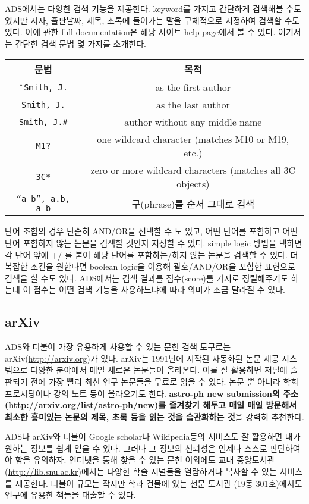 ADS에서는 다양한 검색 기능을 제공한다. keyword를 가지고 간단하게 검색해볼 수도
있지만 저자, 출판날짜, 제목, 초록에 들어가는 말을 구체적으로 지정하여 검색할 수도
있다. 이에 관한 full documentation은 해당 사이트 help page에서 볼 수
있다. 여기서는 간단한 검색 문법 몇 가지를 소개한다.

\begin{tabular}{c|c} \toprule
문법 & 목적 \\ \midrule
\texttt{$\char`\^$Smith, J.} & as the first author \\
\texttt{Smith, J.} & as the last author \\
\texttt{Smith, J.\#} & author without any middle name \\
\texttt{M1?} & one wildcard character (matches M10 or M19, etc.) \\
\texttt{3C*} & zero or more wildcard characters (matches all 3C objects) \\
\texttt{``a b'', a.b, a--b} & 구(phrase)를 순서 그대로 검색 \\ \bottomrule
\end{tabular}

\vspace{\baselineskip} 단어 조합의 경우 단순히 AND/OR을 선택할 수 도 있고, 어떤
단어를 포함하고 어떤 단어 포함하지 않는 논문을 검색할 것인지 지정할 수
있다. simple logic 방법을 택하면 각 단어 앞에 +/-를 붙여 해당 단어를
포함하는/하지 않는 논문을 검색할 수 있다. 더 복잡한 조건을 원한다면 boolean
logic을 이용해 괄호/AND/OR을 포함한 표현으로 검색을 할 수도 있다. ADS에서는 검색
결과를 점수(score)를 가지로 정렬해주기도 하는데 이 점수는 어떤 검색 기능을
사용하느냐에 따라 의미가 조금 달라질 수 있다.
 
\subsection{arXiv}
ADS와 더불어 가장 유용하게 사용할 수 있는 문헌 검색 도구로는
arXiv(\url{http://arxiv.org})가 있다. arXiv는 1991년에 시작된 자동화된 논문 제공
시스템으로 다양한 분야에서 매일 새로운 논문들이 올라온다. 이를 잘 활용하면 저널에
출판되기 전에 가장 빨리 최신 연구 논문들을 무료로 읽을 수 있다. 논문 뿐 아니라
학회 프로시딩이나 강의 노트 등이 올라오기도 한다. \textbf{astro-ph new
  submission의 주소 (\url{http://arxiv.org/list/astro-ph/new})를 즐겨찾기 해두고
  매일 매일 방문해서 최소한 흥미있는 논문의 제목, 초록 등을 읽는 것을 습관화하는
  것}을 강력히 추천한다.

\starbreak ADS나 arXiv와 더불어 Google scholar나 Wikipedia등의 서비스도 잘
활용하면 내가 원하는 정보를 쉽게 얻을 수 있다. 그러나 그 정보의 신뢰성은 언제나
스스로 판단하여야 함을 유의하자. 인터넷을 통해 찾을 수 있는 문헌 이외에도 교내
중앙도서관(\url{http://lib.snu.ac.kr})에서는 다양한 학술 저널들을 열람하거나
복사할 수 있는 서비스를 제공한다. 더불어 규모는 작지만 학과 건물에 있는 천문
도서관 (19동 301호)에서도 연구에 유용한 책들을 대출할 수 있다.

